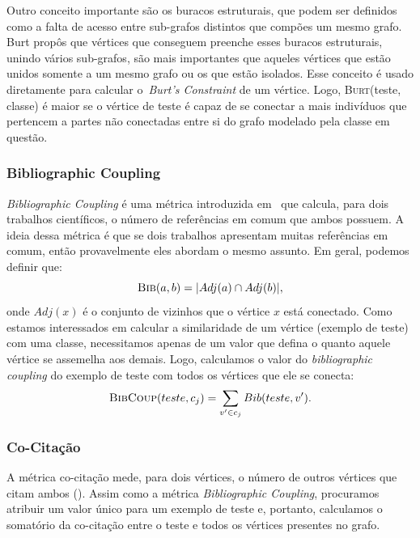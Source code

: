Outro conceito importante são os buracos estruturais, que podem ser definidos como a falta de acesso entre sub-grafos distintos que compões um mesmo grafo. Burt propôs que vértices que conseguem preenche esses buracos estruturais, unindo vários sub-grafos, são mais importantes que aqueles vértices que estão unidos somente a um mesmo grafo ou os que estão isolados. Esse conceito é usado diretamente para calcular o~\textit{Burt's Constraint} de um vértice. Logo, \textsc{Burt}(teste, classe) é maior se o vértice de teste é capaz de se conectar a mais indivíduos que pertencem a partes não conectadas entre si do grafo modelado pela classe em questão.

\subsubsection{Bibliographic Coupling}
\label{subsubsection::bibcoup}
\textit{Bibliographic Coupling} é uma métrica introduzida em~\cite{Kessler63} que calcula, para dois trabalhos científicos, o número de referências em comum que ambos possuem. A ideia dessa métrica é que se dois trabalhos apresentam muitas referências em comum, então provavelmente eles abordam o mesmo assunto. Em geral, podemos definir que:
\begin{equation}
\textsc{Bib}(a, b) =  |Adj(a) \cap Adj(b)|,
\end{equation}
onde $Adj(x)$ é o conjunto de vizinhos que o vértice $x$ está conectado. Como estamos interessados em calcular a similaridade de um vértice (exemplo de teste) com uma classe, necessitamos apenas de um valor que defina o quanto aquele vértice se assemelha aos demais. Logo, calculamos o valor do \textit{bibliographic coupling} do exemplo de teste com todos os vértices que ele se conecta:
\begin{equation}
\textsc{BibCoup}(teste, c_j) =  \sum\limits_{v' \in c_j} Bib(teste, v').
\end{equation}

\subsubsection{Co-Citação}
\label{subsubsection::cocitation}
A métrica co-citação mede, para dois vértices, o número de outros vértices que citam ambos (\cite{Small73}). Assim como a métrica \textit{Bibliographic Coupling}, procuramos atribuir um valor único para um exemplo de teste e, portanto, calculamos o somatório da co-citação entre o teste e todos os vértices presentes no grafo.

